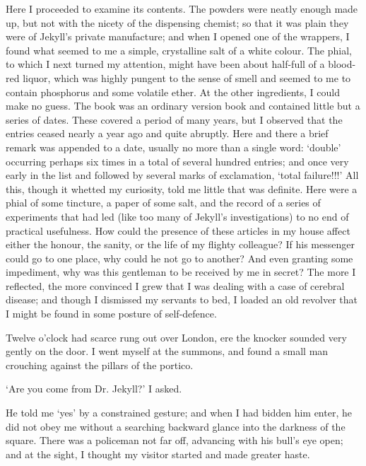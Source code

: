 \documentclass[]{novel}
\begin{document}
Here I proceeded to examine its contents. The powders were neatly enough made up, but not with the nicety of the dispensing chemist; so that it was plain they were of Jekyll’s private manufacture; and when I opened one of the wrappers, I found what seemed to me a simple, crystalline salt of a white colour. The phial, to which I next turned my attention, might have been about half-full of a blood-red liquor, which was highly pungent to the sense of smell and seemed to me to contain phosphorus and some volatile ether. At the other ingredients, I could make no guess. The book was an ordinary version book and contained little but a series of dates. These covered a period of many years, but I observed that the entries ceased nearly a year ago and quite abruptly. Here and there a brief remark was appended to a date, usually no more than a single word: ‘double’ occurring perhaps six times in a total of several hundred entries; and once very early in the list and followed by several marks of exclamation, ‘total failure!!!’ All this, though it whetted my curiosity, told me little that was definite. Here were a phial of some tincture, a paper of some salt, and the record of a series of experiments that had led (like too many of Jekyll’s investigations) to no end of practical usefulness. How could the presence of these articles in my house affect either the honour, the sanity, or the life of my flighty colleague? If his messenger could go to one place, why could he not go to another? And even granting some impediment, why was this gentleman to be received by me in secret? The more I reflected, the more convinced I grew that I was dealing with a case of cerebral disease; and though I dismissed my servants to bed, I loaded an old revolver that I might be found in some posture of self-defence.

Twelve o’clock had scarce rung out over London, ere the knocker sounded very gently on the door. I went myself at the summons, and found a small man crouching against the pillars of the portico.

‘Are you come from Dr. Jekyll?’ I asked.

He told me ‘yes’ by a constrained gesture; and when I had bidden him enter, he did not obey me without a searching backward glance into the darkness of the square. There was a policeman not far off, advancing with his bull’s eye open; and at the sight, I thought my visitor started and made greater haste.
\end{document}
